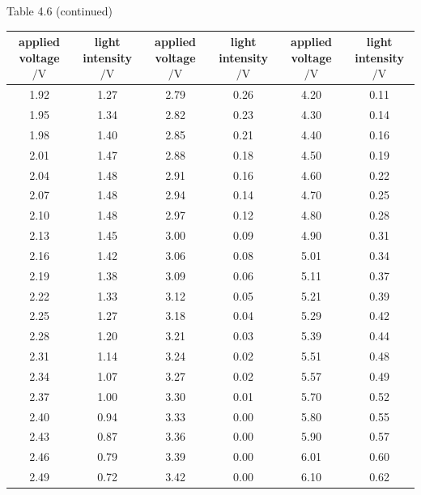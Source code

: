 \begin{center}
{\small Table 4.6 (continued)}\\[3pt]
{\footnotesize
\renewcommand{\arraystretch}{1.08}
\begin{tabular}{|c|c||c|c||c|c|}
\hline
\shortstack{applied\\[-2pt]voltage$/\mathrm{V}$} & \shortstack{light\\[-2pt]intensity$/\mathrm{V}$} & \shortstack{applied\\[-2pt]voltage$/\mathrm{V}$} & \shortstack{light\\[-2pt]intensity$/\mathrm{V}$} & \shortstack{applied\\[-2pt]voltage$/\mathrm{V}$} & \shortstack{light\\[-2pt]intensity$/\mathrm{V}$}\\
\hline
1.92 & 1.27 & 2.79 & 0.26 & 4.20 & 0.11\\
\hline
1.95 & 1.34 & 2.82 & 0.23 & 4.30 & 0.14\\
\hline
1.98 & 1.40 & 2.85 & 0.21 & 4.40 & 0.16\\
\hline
2.01 & 1.47 & 2.88 & 0.18 & 4.50 & 0.19\\
\hline
2.04 & 1.48 & 2.91 & 0.16 & 4.60 & 0.22\\
\hline
2.07 & 1.48 & 2.94 & 0.14 & 4.70 & 0.25\\
\hline
2.10 & 1.48 & 2.97 & 0.12 & 4.80 & 0.28\\
\hline
2.13 & 1.45 & 3.00 & 0.09 & 4.90 & 0.31\\
\hline
2.16 & 1.42 & 3.06 & 0.08 & 5.01 & 0.34\\
\hline
2.19 & 1.38 & 3.09 & 0.06 & 5.11 & 0.37\\
\hline
2.22 & 1.33 & 3.12 & 0.05 & 5.21 & 0.39\\
\hline
2.25 & 1.27 & 3.18 & 0.04 & 5.29 & 0.42\\
\hline
2.28 & 1.20 & 3.21 & 0.03 & 5.39 & 0.44\\
\hline
2.31 & 1.14 & 3.24 & 0.02 & 5.51 & 0.48\\
\hline
2.34 & 1.07 & 3.27 & 0.02 & 5.57 & 0.49\\
\hline
2.37 & 1.00 & 3.30 & 0.01 & 5.70 & 0.52\\
\hline
2.40 & 0.94 & 3.33 & 0.00 & 5.80 & 0.55\\
\hline
2.43 & 0.87 & 3.36 & 0.00 & 5.90 & 0.57\\
\hline
2.46 & 0.79 & 3.39 & 0.00 & 6.01 & 0.60\\
\hline
2.49 & 0.72 & 3.42 & 0.00 & 6.10 & 0.62\\

\end{tabular}}
\end{center}

